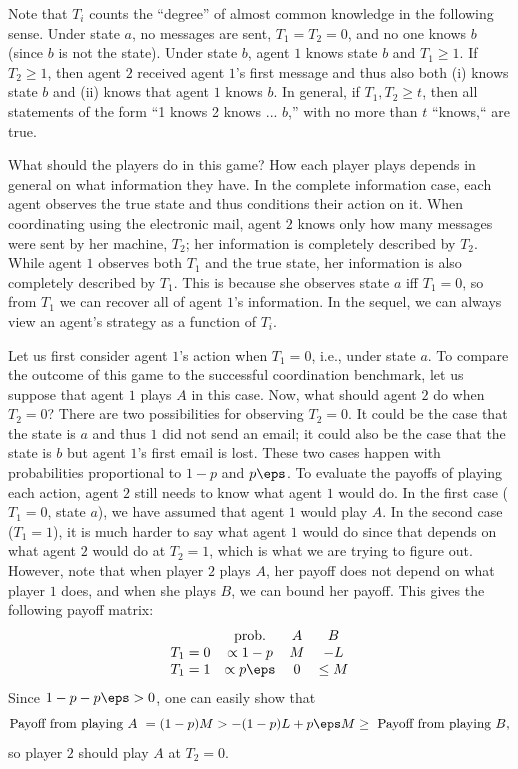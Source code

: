 Note that \(T_i\) counts the ``degree'' of almost common knowledge in the following sense.
Under state \(a\), no messages are sent, \(T_1 = T_2 = 0\), and no one knows \(b\) (since \(b\) is not the state).
Under state \(b\), agent \(1\) knows state \(b\) and \(T_1 \geq 1\).
If \(T_2 \geq 1\), then agent \(2\) received agent \(1\)'s first message and thus also both (i) knows state \(b\) and (ii) knows that agent \(1\) knows \(b\).
In general, if \(T_1, T_2 \geq t\), then all statements of the form ``1 knows 2 knows ... \(b\),'' with no more than \(t\) ``knows,`` are true.

What should the players do in this game?
How each player plays depends in general on what information they have.
In the complete information case, each agent observes the true state and thus conditions their action on it.
When coordinating using the electronic mail, agent \(2\) knows only how many messages were sent by her machine, \(T_2\); her information is completely described by \(T_2\).
While agent \(1\) observes both \(T_1\) and the true state, her information is also completely described by \(T_1\).
This is because she observes state \(a\) iff \(T_1 = 0\), so from \(T_1\) we can recover all of agent \(1\)'s information.
In the sequel, we can always view an agent's strategy as a function of \(T_i\).

Let us first consider agent \(1\)'s action when \(T_1 = 0\), i.e., under state \(a\).
To compare the outcome of this game to the successful coordination benchmark, let us suppose that agent \(1\) plays \(A\) in this case.
Now, what should agent \(2\) do when \(T_2 = 0\)?
There are two possibilities for observing \(T_2 = 0\).
It could be the case that the state is \(a\) and thus \(1\) did not send an email; it could also be the case that the state is \(b\) but agent \(1\)'s first email is lost.
These two cases happen with probabilities proportional to \(1 - p\) and \(p \eps\).
To evaluate the payoffs of playing each action, agent \(2\) still needs to know what agent \(1\) would do.
In the first case (\(T_1 = 0\), state \(a\)), we have assumed that agent \(1\) would play \(A\).
In the second case (\(T_1 = 1\)), it is much harder to say what agent \(1\) would do since that depends on what agent \(2\) would do at \(T_2 = 1\), which is what we are trying to figure out.
However, note that when player \(2\) plays \(A\), her payoff does not depend on what player \(1\) does, and when she plays \(B\), we can bound her payoff.
This gives the following payoff matrix:
\[
  \begin{array}{cc cc}
    & \text{prob.} & A & B \\
  T_1 = 0 & \propto 1 - p & M & -L \\
  T_1 = 1 & \propto p \eps & 0 & \leq M
  \end{array}
\]
Since \(1 - p - p \eps > 0\), one can easily show that
\[
  \text{Payoff from playing \(A\) }
  = (1 - p) M
  > -(1 - p)L + p \eps M
  \geq \text{ Payoff from playing \(B\)},
\]
so player \(2\) should play \(A\) at \(T_2 = 0\).

